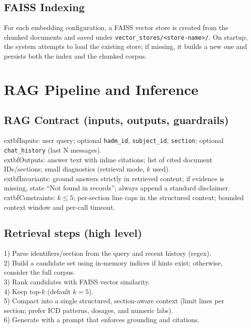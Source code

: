 \subsection{FAISS Indexing}
For each embedding configuration, a FAISS vector store is created from the chunked documents and saved under \texttt{vector\_stores/<store-name>/}. On startup, the system attempts to load the existing store; if missing, it builds a new one and persists both the index and the chunked corpus.

\section{RAG Pipeline and Inference}

\subsection{RAG Contract (inputs, outputs, guardrails)}
  	extbf{Inputs:} user query; optional \texttt{hadm\_id}, \texttt{subject\_id}, \texttt{section}; optional \texttt{chat\_history} (last N messages).\\
  	extbf{Outputs:} answer text with inline citations; list of cited document IDs/sections; small diagnostics (retrieval mode, \(k\) used).\\
  	extbf{Invariants:} ground answers strictly in retrieved content; if evidence is missing, state ``Not found in records''; always append a standard disclaimer.\\
  	extbf{Constraints:} \(k \le 5\); per-section line caps in the structured context; bounded context window and per-call timeout.

\subsection{Retrieval steps (high level)}
1) Parse identifiers/section from the query and recent history (regex).\\
2) Build a candidate set using in-memory indices if hints exist; otherwise, consider the full corpus.\\
3) Rank candidates with FAISS vector similarity.\\
4) Keep top-\(k\) (default \(k=5\)).\\
5) Compact into a single structured, section-aware context (limit lines per section; prefer ICD patterns, dosages, and numeric labs).\\
6) Generate with a prompt that enforces grounding and citations.

